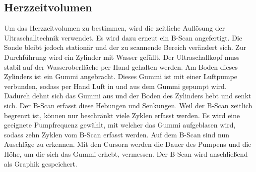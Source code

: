 \subsection{Herzzeitvolumen}

Um das Herzzeitvolumen zu bestimmen, wird die zeitliche Auflösung der Ultraschalltechnik verwendet. 
Es wird dazu erneut ein B-Scan angefertigt. Die Sonde bleibt jedoch stationär und der zu scannende 
Bereich verändert sich. Zur Durchführung wird ein Zylinder mit Wasser gefüllt. Der Ultraschallkopf 
muss stabil auf der Wasseroberfläche per Hand gehalten werden. Am Boden dieses 
Zylinders ist ein Gummi angebracht. Dieses Gummi ist mit einer Luftpumpe verbunden, sodass per Hand 
Luft in und aus dem Gummi gepumpt wird. Dadurch dehnt sich das Gummi aus und der Boden des Zylinders 
hebt und senkt sich. Der B-Scan erfasst diese Hebungen und Senkungen. Weil der B-Scan zeitlich 
begrenzt ist, können nur beschränkt viele Zyklen erfasst werden. Es wird eine geeignete Pumpfrequenz 
gewählt, mit welcher das Gummi aufgeblasen wird, sodass zehn Zyklen vom B-Scan erfasst werden. Auf 
dem B-Scan sind nun Auschläge zu erkennen. Mit den Cursorn werden die Dauer des Pumpens und die Höhe, um 
die sich das Gummi erhebt, vermessen. Der B-Scan wird anschließend als Graphik gespeichert.









